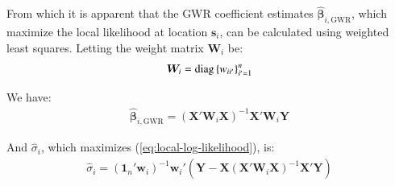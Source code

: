 \documentclass[authoryear, review, 11pt]{elsarticle}
\begin{document}
	From which it is apparent that the GWR coefficient estimates $\hat{\bm{\beta}}_{i,\text{GWR}}$, which maximize the local likelihood at location $\bm{s}_i$, can be calculated using weighted least squares. Letting the weight matrix $\bm{W}_i$ be:
	\begin{eqnarray}
		\bm{W}_i =  {\rm diag}\left\{w_{ii'}\right\}_{i' = 1}^n
	\end{eqnarray}
	
	We have:	
	\begin{eqnarray}
		\hat{\bm{\beta}}_{i, \text{GWR}} = \left( \bm{X}'\bm{W}_i\bm{X} \right)^{-1} \bm{X}'\bm{W}_i\bm{Y}
	\end{eqnarray}
	
	And $\hat{\sigma}_i$, which maximizes (\ref{eq:local-log-likelihood}), is:
	\begin{eqnarray}
		\hat{\sigma}_i = \left(\bm{1}_n'\bm{w}_i \right)^{-1} \bm{w}_i'\left(\bm{Y}-\bm{X}\left(\bm{X}'\bm{W}_i\bm{X}\right)^{-1}\bm{X}'\bm{Y}\right)
	\end{eqnarray}
	
\end{document}
